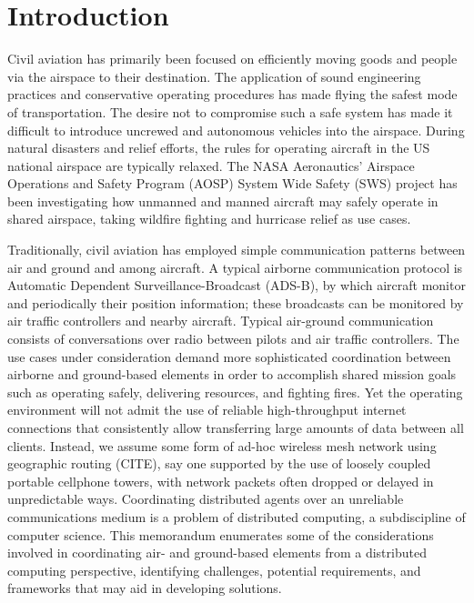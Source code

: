 \section{Introduction}

Civil aviation has primarily been focused on efficiently moving goods
and people via the airspace to their destination. The application of
sound engineering practices and conservative operating procedures has
made flying the safest mode of transportation. The desire not to
compromise such a safe system has made it difficult to introduce
uncrewed and autonomous vehicles into the airspace. During natural
disasters and relief efforts, the rules for operating aircraft in the
US national airspace are typically relaxed. The NASA Aeronautics'
Airspace Operations and Safety Program (AOSP) System Wide Safety (SWS)
project has been investigating how unmanned and manned aircraft may
safely operate in shared airspace, taking wildfire fighting and
hurricase relief as use cases.

Traditionally, civil aviation has employed simple communication
patterns between air and ground and among aircraft. A typical airborne
communication protocol is Automatic Dependent Surveillance-Broadcast
(ADS-B), by which aircraft monitor and periodically their position
information; these broadcasts can be monitored by air traffic
controllers and nearby aircraft. Typical air-ground communication
consists of conversations over radio between pilots and air traffic
controllers. The use cases under consideration demand more
sophisticated coordination between airborne and ground-based elements
in order to accomplish shared mission goals such as operating safely,
delivering resources, and fighting fires. Yet the operating
environment will not admit the use of reliable high-throughput
internet connections that consistently allow transferring large
amounts of data between all clients. Instead, we assume some form of
ad-hoc wireless mesh network using geographic routing (CITE), say one
supported by the use of loosely coupled portable cellphone towers,
with network packets often dropped or delayed in unpredictable
ways. Coordinating distributed agents over an unreliable
communications medium is a problem of distributed computing, a
subdiscipline of computer science. This memorandum enumerates some of
the considerations involved in coordinating air- and ground-based
elements from a distributed computing perspective, identifying
challenges, potential requirements, and frameworks that may aid in
developing solutions.

